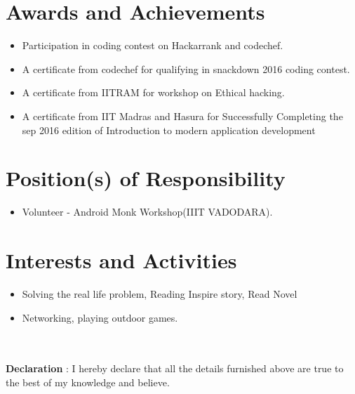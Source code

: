 \documentclass{article}
\begin{document}
\section{Awards and Achievements}
\begin{itemize}
\item Participation in coding contest on Hackarrank and codechef.
\item A certificate from codechef for qualifying in snackdown 2016 coding contest.
\item A certificate from IITRAM for workshop on Ethical hacking.
\item A certificate from IIT Madras and Hasura for Successfully Completing the sep 2016 edition of Introduction to modern application development 
 
\end{itemize}


\section{Position(s) of Responsibility}

\begin{itemize}
\item Volunteer - Android Monk  Workshop(IIIT VADODARA). 
\end{itemize}



\section{Interests and Activities}
\begin{itemize}
\item Solving the real life problem, Reading Inspire story, Read Novel
\item Networking, playing outdoor games.\end{itemize}\\\\

\textbf{Declaration} : I hereby declare that all the details furnished above are true to the best of my knowledge and believe.
\end{document}
